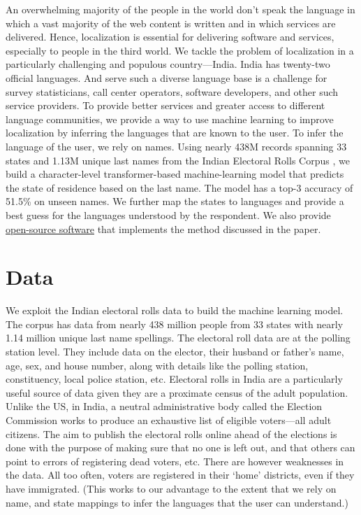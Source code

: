 \documentclass[11pt,  letterpaper]{article}
\begin{document}
An overwhelming majority of the people in the world don’t speak the language in which a vast majority of the web content is written and in which services are delivered. Hence, localization is essential for delivering software and services, especially to people in the third world. We tackle the problem of localization in a particularly challenging and populous country—India. India has twenty-two official languages. And serve such a diverse language base is a challenge for survey statisticians, call center operators, software developers, and other such service providers. To provide better services and greater access to different language communities, we provide a way to use machine learning to improve localization by inferring the languages that are known to the user. To infer the language of the user, we rely on names. Using nearly 438M records spanning 33 states and 1.13M unique last names from the Indian Electoral Rolls Corpus \citep{DVN/OG47IV_2023}, we build a character-level transformer-based machine-learning model that predicts the state of residence based on the last name. The model has a top-3 accuracy of 51.5\%  on unseen names. We further map the states to languages and provide a best guess for the languages understood by the respondent. We also provide \href{https://github.com/in-rolls/instate}{open-source software} that implements the method discussed in the paper. 


\section{Data}

We exploit the Indian electoral rolls data \citep{DVN/OG47IV_2023, DVN/MUEGDT_2018} to build the machine learning model. The corpus has data from nearly 438 million people from 33 states with nearly 1.14 million unique last name spellings. The electoral roll data are at the polling station level. They include data on the elector, their husband or father’s name, age, sex, and house number, along with details like the polling station, constituency, local police station, etc. Electoral rolls in India are a particularly useful source of data given they are a proximate census of the adult population. Unlike the US, in India, a neutral administrative body called the Election Commission works to produce an exhaustive list of eligible voters—all adult citizens. The aim to publish the electoral rolls online ahead of the elections is done with the purpose of making sure that no one is left out, and that others can point to errors of registering dead voters, etc. There are however weaknesses in the data. All too often, voters are registered in their ‘home’ districts, even if they have immigrated. (This works to our advantage to the extent that we rely on name, and state mappings to infer the languages that the user can understand.)
\end{document}

